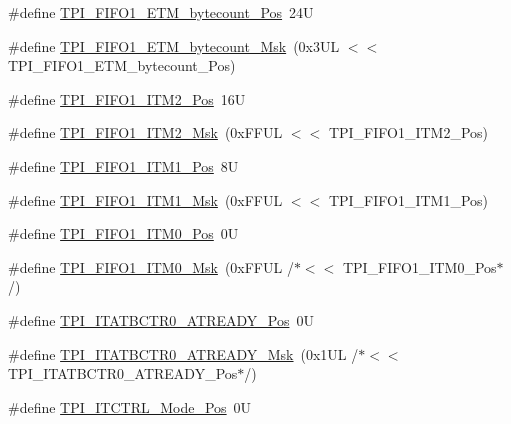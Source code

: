 \begin{DoxyCompactItemize}
\item 
\#define \hyperlink{group___c_m_s_i_s___t_p_i_gaab31238152b5691af633a7475eaf1f06}{T\-P\-I\-\_\-\-F\-I\-F\-O1\-\_\-\-E\-T\-M\-\_\-bytecount\-\_\-\-Pos}~24\-U
\item 
\#define \hyperlink{group___c_m_s_i_s___t_p_i_gab554305459953b80554fdb1908b73291}{T\-P\-I\-\_\-\-F\-I\-F\-O1\-\_\-\-E\-T\-M\-\_\-bytecount\-\_\-\-Msk}~(0x3\-U\-L $<$$<$ T\-P\-I\-\_\-\-F\-I\-F\-O1\-\_\-\-E\-T\-M\-\_\-bytecount\-\_\-\-Pos)
\item 
\#define \hyperlink{group___c_m_s_i_s___t_p_i_ga1828c228f3940005f48fb8dd88ada35b}{T\-P\-I\-\_\-\-F\-I\-F\-O1\-\_\-\-I\-T\-M2\-\_\-\-Pos}~16\-U
\item 
\#define \hyperlink{group___c_m_s_i_s___t_p_i_gae54512f926ebc00f2e056232aa21d335}{T\-P\-I\-\_\-\-F\-I\-F\-O1\-\_\-\-I\-T\-M2\-\_\-\-Msk}~(0x\-F\-F\-U\-L $<$$<$ T\-P\-I\-\_\-\-F\-I\-F\-O1\-\_\-\-I\-T\-M2\-\_\-\-Pos)
\item 
\#define \hyperlink{group___c_m_s_i_s___t_p_i_gaece86ab513bc3d0e0a9dbd82258af49f}{T\-P\-I\-\_\-\-F\-I\-F\-O1\-\_\-\-I\-T\-M1\-\_\-\-Pos}~8\-U
\item 
\#define \hyperlink{group___c_m_s_i_s___t_p_i_ga3347f42828920dfe56e3130ad319a9e6}{T\-P\-I\-\_\-\-F\-I\-F\-O1\-\_\-\-I\-T\-M1\-\_\-\-Msk}~(0x\-F\-F\-U\-L $<$$<$ T\-P\-I\-\_\-\-F\-I\-F\-O1\-\_\-\-I\-T\-M1\-\_\-\-Pos)
\item 
\#define \hyperlink{group___c_m_s_i_s___t_p_i_ga2188671488417a52abb075bcd4d73440}{T\-P\-I\-\_\-\-F\-I\-F\-O1\-\_\-\-I\-T\-M0\-\_\-\-Pos}~0\-U
\item 
\#define \hyperlink{group___c_m_s_i_s___t_p_i_ga8ae09f544fc1a428797e2a150f14a4c9}{T\-P\-I\-\_\-\-F\-I\-F\-O1\-\_\-\-I\-T\-M0\-\_\-\-Msk}~(0x\-F\-F\-U\-L /$\ast$$<$$<$ T\-P\-I\-\_\-\-F\-I\-F\-O1\-\_\-\-I\-T\-M0\-\_\-\-Pos$\ast$/)
\item 
\#define \hyperlink{group___c_m_s_i_s___t_p_i_gab1eb6866c65f02fa9c83696b49b0f346}{T\-P\-I\-\_\-\-I\-T\-A\-T\-B\-C\-T\-R0\-\_\-\-A\-T\-R\-E\-A\-D\-Y\-\_\-\-Pos}~0\-U
\item 
\#define \hyperlink{group___c_m_s_i_s___t_p_i_gaee320b3c60f9575aa96a8742c4ff9356}{T\-P\-I\-\_\-\-I\-T\-A\-T\-B\-C\-T\-R0\-\_\-\-A\-T\-R\-E\-A\-D\-Y\-\_\-\-Msk}~(0x1\-U\-L /$\ast$$<$$<$ T\-P\-I\-\_\-\-I\-T\-A\-T\-B\-C\-T\-R0\-\_\-\-A\-T\-R\-E\-A\-D\-Y\-\_\-\-Pos$\ast$/)
\item 
\#define \hyperlink{group___c_m_s_i_s___t_p_i_gaa847adb71a1bc811d2e3190528f495f0}{T\-P\-I\-\_\-\-I\-T\-C\-T\-R\-L\-\_\-\-Mode\-\_\-\-Pos}~0\-U
\item 
$$
\end{DoxyCompactItemize}
